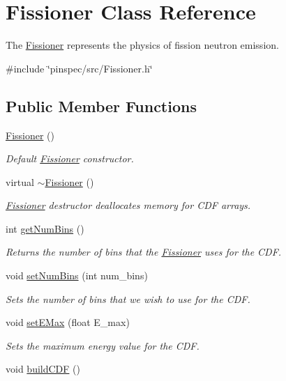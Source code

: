 \hypertarget{classFissioner}{\section{Fissioner Class Reference}
\label{classFissioner}
}


The \hyperlink{classFissioner}{Fissioner} represents the physics of fission neutron emission.  




{\ttfamily \#include \char`\"{}pinspec/src/\-Fissioner.\-h\char`\"{}}

\subsection*{Public Member Functions}
\begin{DoxyCompactItemize}
\item 
\hyperlink{classFissioner_afcd97a27d994cf3fefb474c9f5887e79}{Fissioner} ()
\begin{DoxyCompactList}\small\item\em Default \hyperlink{classFissioner}{Fissioner} constructor. \end{DoxyCompactList}\item 
\hypertarget{classFissioner_a5b5045b1de9a25a6022aec9124a1b024}{virtual \hyperlink{classFissioner_a5b5045b1de9a25a6022aec9124a1b024}{$\sim$\-Fissioner} ()}\label{classFissioner_a5b5045b1de9a25a6022aec9124a1b024}

\begin{DoxyCompactList}\small\item\em \hyperlink{classFissioner}{Fissioner} destructor deallocates memory for C\-D\-F arrays. \end{DoxyCompactList}\item 
int \hyperlink{classFissioner_a32207d324d2859dcded929d646305425}{get\-Num\-Bins} ()
\begin{DoxyCompactList}\small\item\em Returns the number of bins that the \hyperlink{classFissioner}{Fissioner} uses for the C\-D\-F. \end{DoxyCompactList}\item 
void \hyperlink{classFissioner_a0ccf4ae781088313fd20975aa8d9d789}{set\-Num\-Bins} (int num\-\_\-bins)
\begin{DoxyCompactList}\small\item\em Sets the number of bins that we wish to use for the C\-D\-F. \end{DoxyCompactList}\item 
void \hyperlink{classFissioner_a77c0acd5b3cc8a9b58a7a0fb4182479d}{set\-E\-Max} (float E\-\_\-max)
\begin{DoxyCompactList}\small\item\em Sets the maximum energy value for the C\-D\-F. \end{DoxyCompactList}\item 
\hypertarget{classFissioner_a7e5dd36d86e2b9e026d65bfbc152210b}{void \hyperlink{classFissioner_a7e5dd36d86e2b9e026d65bfbc152210b}{build\-C\-D\-F} ()}\label{classFissioner_a7e5dd36d86e2b9e026d65bfbc152210b}


\end{DoxyCompactItemize}
